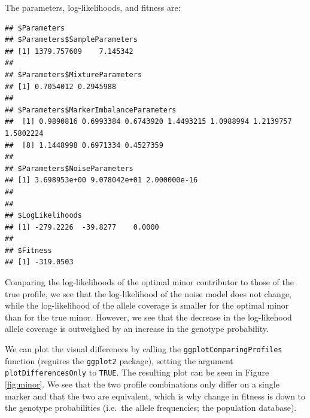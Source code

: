 \documentclass[]{article}
\newenvironment{Shaded}{\begin{snugshade}}{\end{snugshade}}
\newcommand{\KeywordTok}[1]{\textcolor[rgb]{0.13,0.29,0.53}{\textbf{#1}}}
\newcommand{\DecValTok}[1]{\textcolor[rgb]{0.00,0.00,0.81}{#1}}
\newcommand{\StringTok}[1]{\textcolor[rgb]{0.31,0.60,0.02}{#1}}
\newcommand{\OtherTok}[1]{\textcolor[rgb]{0.56,0.35,0.01}{#1}}
\newcommand{\OperatorTok}[1]{\textcolor[rgb]{0.81,0.36,0.00}{\textbf{#1}}}
\newcommand{\NormalTok}[1]{#1}
\begin{document}
The parameters, log-likelihoods, and fitness are:

\begin{Shaded}
\end{Shaded}

\begin{verbatim}
## $Parameters
## $Parameters$SampleParameters
## [1] 1379.757609    7.145342
## 
## $Parameters$MixtureParameters
## [1] 0.7054012 0.2945988
## 
## $Parameters$MarkerImbalanceParameters
##  [1] 0.9890816 0.6993384 0.6743920 1.4493215 1.0988994 1.2139757 1.5802224
##  [8] 1.1448998 0.6971334 0.4527359
## 
## $Parameters$NoiseParameters
## [1] 3.698953e+00 9.078042e+01 2.000000e-16
## 
## 
## $LogLikelihoods
## [1] -279.2226  -39.8277    0.0000
## 
## $Fitness
## [1] -319.0503
\end{verbatim}

Comparing the log-likelihoods of the optimal minor contributor to those
of the true profile, we see that the log-likelihood of the noise model
does not change, while the log-likelihood of the allele coverage is
smaller for the optimal minor than for the true minor. However, we see
that the decrease in the log-likehood allele coverage is outweighed by
an increase in the genotype probability.

We can plot the visual differences by calling the
\texttt{ggplotComparingProfiles} function (reguires the \texttt{ggplot2}
package), setting the argument \texttt{plotDifferencesOnly} to
\texttt{TRUE}. The resulting plot can be seen in Figure \ref{fig:minor}.
We see that the two profile combinations only differ on a single marker
and that the two are equivalent, which is why change in fitness is down
to the genotype probabilities (i.e.~the allele frequencies; the
population database).

\begin{Shaded}
\end{Shaded}
\end{document}
